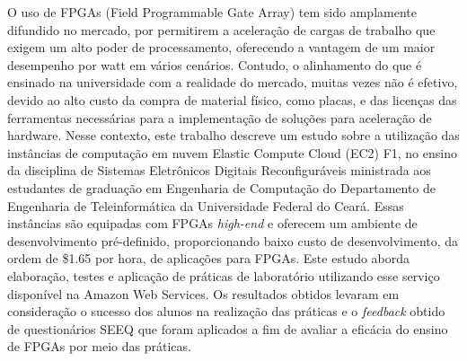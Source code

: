 O uso de FPGAs (Field Programmable Gate Array) tem sido amplamente difundido no mercado, por permitirem  a aceleração de cargas de trabalho que exigem um alto poder de processamento, oferecendo a vantagem de um maior desempenho por watt em vários cenários. Contudo, o alinhamento do que é ensinado na universidade com a realidade do mercado, muitas vezes não é efetivo, devido ao alto custo da compra de material físico, como placas, e das licenças das ferramentas necessárias para a implementação de soluções para aceleração de hardware. Nesse contexto, este trabalho descreve um estudo sobre a utilização das instâncias de computação em nuvem Elastic Compute Cloud (EC2) F1, no ensino da disciplina de Sistemas Eletrônicos Digitais Reconfiguráveis ministrada aos estudantes de graduação em Engenharia de Computação do Departamento de Engenharia de Teleinformática da Universidade Federal do Ceará. Essas instâncias são equipadas com FPGAs \textit{high-end} e oferecem um ambiente de desenvolvimento pré-definido, proporcionando baixo custo de desenvolvimento, da ordem de \$1.65 por hora, de aplicações para FPGAs. Este estudo aborda elaboração, testes e aplicação de práticas de laboratório utilizando esse serviço disponível na Amazon Web Services. Os resultados obtidos levaram em consideração o sucesso dos alunos na realização das práticas e o \textit{feedback} obtido de questionários SEEQ que foram aplicados a fim de avaliar a eficácia do ensino de FPGAs por meio das práticas.


